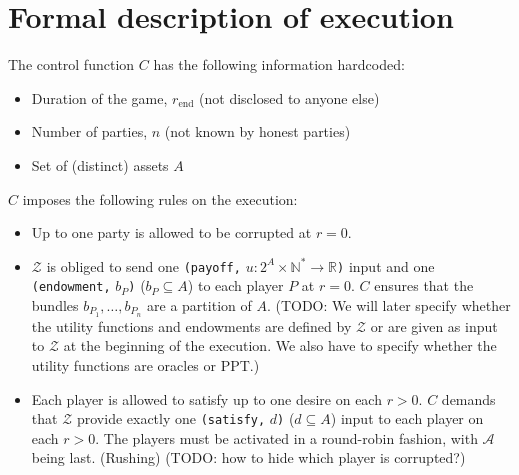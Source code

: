 \section{Formal description of execution}
  The control function $C$ has the following information hardcoded:
  \begin{itemize}
    \item Duration of the game, $r_{\mathrm{end}}$ (not disclosed to anyone else)
    \item Number of parties, $n$ (not known by honest parties)
    \item Set of (distinct) assets $A$
  \end{itemize}
  $C$ imposes the following rules on the execution:
  \begin{itemize}
    \item Up to one party is allowed to be corrupted at $r = 0$.
    \item $\mathcal{Z}$ is obliged to send one \texttt{(payoff,} $u : 2^A \times
    \mathbb{N}^* \rightarrow \mathbb{R}$\texttt{)} input and one \texttt{(endowment,}
    $b_P$\texttt{)} ($b_P \subseteq A$) to each player $P$ at $r = 0$. $C$ ensures that
    the bundles $b_{P_1}, \dots, b_{P_n}$ are a partition of $A$. (TODO: We will later
    specify whether the utility functions and endowments are defined by $\mathcal{Z}$ or
    are given as input to $\mathcal{Z}$ at the beginning of the execution. We also have to
    specify whether the utility functions are oracles or PPT.)
    \item Each player is allowed to satisfy up to one desire on each $r > 0$. $C$ demands
    that $\mathcal{Z}$ provide exactly one \texttt{(satisfy,} $d$\texttt{)} ($d \subseteq
    A$) input to each player on each $r > 0$. The players must be activated in a
    round-robin fashion, with $\mathcal{A}$ being last. (Rushing) (TODO: how to hide which
    player is corrupted?)
  \end{itemize}

